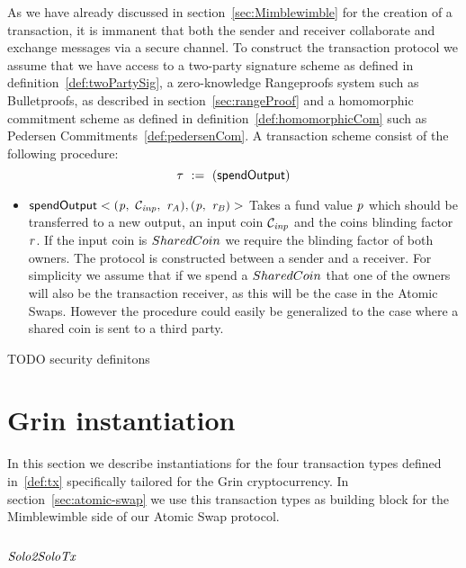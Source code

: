 \begin{definition}
    \label{def:tx}
    As we have already discussed in section~\ref{sec:Mimblewimble} for the creation of a transaction, it is immanent that both the sender and receiver collaborate and exchange messages via a secure channel.
    To construct the transaction protocol we assume that we have access to a two-party signature scheme as defined in definition~\ref{def:twoPartySig}, a zero-knowledge Rangeproofs system such as Bulletproofs, as
    described in section~\ref{sec:rangeProof} and a homomorphic commitment scheme as defined in definition~\ref{def:homomorphicCom} such as Pedersen Commitments~\ref{def:pedersenCom}.
    A transaction scheme consist of the following procedure:
    \[ \tau ~:=~ ( \mathsf{spendOutput} ) \]
    \begin{itemize}
        \item $\mathsf{spendOutput}<(\mathit{p} ,~ \mathcal{C}_{\mathit{inp}} ,~ \mathit{r}_{\mathit{A}}), (\mathit{p} ,~ \mathit{r}_{\mathit{B}})>$ Takes a fund value $\mathit{p}$ which should be transferred to a new output, an input coin $\mathcal{C}_{\mathit{inp}}$ and the coins blinding factor $\mathit{r}$. If the input coin is $SharedCoin$ we require the blinding factor of both owners. The protocol is constructed between a sender and a receiver. For simplicity we assume that if we spend a $SharedCoin$ that one of the owners will also be the transaction receiver, as this will be the case in the Atomic Swaps. However the procedure could easily be generalized to the case where a shared coin is sent to a third party.
    \end{itemize}
\end{definition}

TODO security definitons

\section{Grin instantiation}\label{sec:atomic-inst}

In this section we describe instantiations for the four transaction types defined in~\ref{def:tx} specifically tailored for the Grin cryptocurrency. In section~\ref{sec:atomic-swap} we use this transaction types as building block for the Mimblewimble side of our Atomic Swap protocol.

\subsection{$\mathit{Solo2SoloTx}$}

